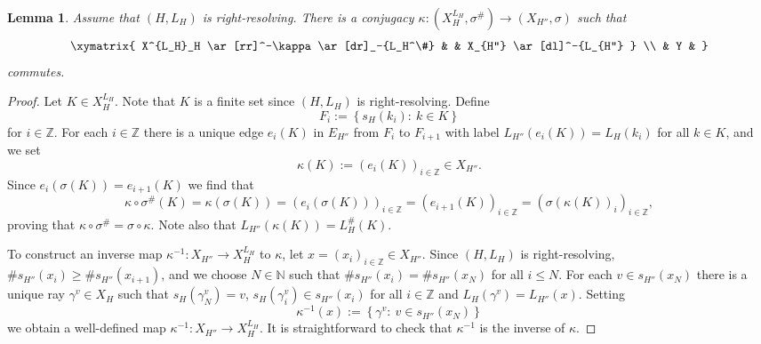 \documentclass[12pt,oneside,english]{amsart}
\newtheorem{lemma}[thm]{Lemma}
\begin{document}
\begin{lemma}\label{23-06-25dyx} Assume that $(H,L_H)$ is right-resolving. There is a conjugacy $\kappa : (X_H^{L_H}, \sigma^\#) \to (X_{H''} , \sigma)$ such that
\begin{equation*}\label{23-06-25cy}
\xymatrix{
 X^{L_H}_H \ar[rr]^-\kappa \ar[dr]_-{L_H^\#} & &  X_{H''}  \ar[dl]^-{L_{H''} } \\
 & Y & }
\end{equation*}
commutes.
\end{lemma}
\begin{proof} Let $ K \in X^{L_H}_H$. Note that $K$ is a finite set since $(H,L_H)$ is right-resolving. Define 
$$
F_i := \left\{ s_H(k_i) : \ k \in K \right\}
$$
for $i \in \mathbb Z$. For each $i \in \mathbb Z$ there is a unique edge $e_i(K)$ in $E_{H''} $ from $F_i$ to $F_{i+1}$ with label $L_{H''} (e_i(K)) = L_H(k_i)$ for all $k \in K$, and we set
$$
\kappa(K) := \left(e_i(K)\right)_{i \in \mathbb Z} \in X_{H''}  .
$$ 
Since $e_i(\sigma(K)) = e_{i+1}(K)$ we find that 
$$
\kappa \circ \sigma^\#(K) = \kappa(\sigma(K)) = \left(e_i(\sigma(K))\right)_{i \in \mathbb Z} = \left(e_{i+1}(K)\right)_{i \in \mathbb Z} = \left(\sigma(\kappa(K))_i\right)_{i \in \mathbb Z},
$$
proving that $\kappa\circ \sigma^\# = \sigma \circ \kappa$. Note also that $L_{H''}  (\kappa(K)) = L_H^\#(K)$.


To construct an inverse map $\kappa^{-1} : X_{H''}  \to X_H^{L_H}$ to $\kappa$, let $x = (x_i)_{i \in \mathbb Z} \in X_{H''} $. Since $(H,L_H)$ is right-resolving, $\# s_{H''} (x_i) \geq  \# s_{H''} (x_{i+1})$, and we choose $N \in \mathbb N$ such that $\# s_{H''} (x_i) = \# s_{H''} (x_N)$ for all $i \leq N$. For each $v \in  s_{H''} (x_N)$ there is a unique ray $\gamma^v \in X_H$ such that $s_H(\gamma^v_N) = v$, $s_H(\gamma^v_i) \in s_{H''}(x_i)$ for all $i \in \mathbb Z$ and $L_H(\gamma^v) = L_{H''} (x)$. Setting
$$
\kappa^{-1}(x) := \left\{\gamma^v : \ v \in  s_{H''} (x_N) \right\} 
$$
we obtain a well-defined map $\kappa^{-1}: X_{H''}  \to X^{L_H}_H$. It is straightforward to check that $\kappa^{-1}$ is the inverse of $\kappa$.



\end{proof}
\end{document}
